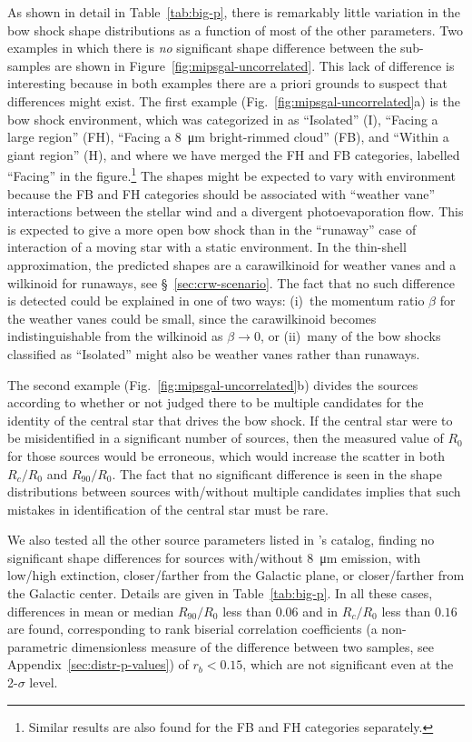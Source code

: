 As shown in detail in Table~\ref{tab:big-p}, there is remarkably
little variation in the bow shock shape distributions as a function of
most of the other parameters.  Two examples in which there is
\textit{no} significant shape difference between the sub-samples are
shown in Figure~\ref{fig:mipsgal-uncorrelated}.  This lack of
difference is interesting because in both examples there are a priori
grounds to suspect that differences might exist.  The first example (Fig.~\ref{fig:mipsgal-uncorrelated}a) is
the bow shock environment, which was categorized in
\citet{Kobulnicky:2016a} as ``Isolated'' (I), ``Facing a large \hii{}
region'' (FH), ``Facing a \SI{8}{\um} bright-rimmed cloud'' (FB), and
``Within a giant \hii{} region'' (H), and where we have merged the FH
and FB categories, labelled ``Facing'' in the figure.\footnote{Similar
  results are also found for the FB and FH categories separately.}
The shapes might be expected to vary with environment because the FB
and FH categories should be associated with ``weather vane''
interactions \citep{Povich:2008a} between the stellar wind and a
divergent photoevaporation flow.  This is expected to give a more open
bow shock than in the ``runaway'' case of interaction of a moving star
with a static environment.  In the thin-shell approximation, the
predicted shapes are a carawilkinoid for weather vanes and a wilkinoid
for runaways, see \S~\ref{sec:crw-scenario}.  The fact that no such
difference is detected could be explained in one of two ways: (i)~the
momentum ratio \(\beta\) for the weather vanes could be small, since the
carawilkinoid becomes indistinguishable from the wilkinoid as
\(\beta \to 0\), or (ii)~many of the bow shocks classified as ``Isolated''
might also be weather vanes rather than runaways.

The second example (Fig.~\ref{fig:mipsgal-uncorrelated}b) divides the
sources according to whether or not \citet{Kobulnicky:2016a} judged
there to be multiple candidates for the identity of the central star
that drives the bow shock.  If the central star were to be
misidentified in a significant number of sources, then the measured
value of \(R_0\) for those sources would be erroneous, which would
increase the scatter in both \(R_c/R_0\) and \(R_{90}/R_0\).  The
fact that no significant difference is seen in the shape distributions
between sources with/without multiple candidates implies that such
mistakes in identification of the central star must be rare.

We also tested all the other source parameters listed in
\citeauthor{Kobulnicky:2016a}'s catalog, finding no significant shape
differences for sources with/without \SI{8}{\um} emission, with
low/high extinction, closer/farther from the Galactic plane, or
closer/farther from the Galactic center. Details are given in
Table~\ref{tab:big-p}.  In all these cases, differences in mean or
median \(R_{90}/R_0\) less than \(0.06\) and in \(R_c/R_0\) less than
\(0.16\) are found, corresponding to rank biserial correlation
coefficients (a non-parametric dimensionless measure of the difference
between two samples, see Appendix~\ref{sec:distr-p-values}) of
\(r_b < 0.15\), which are not significant even at the 2-\(\sigma\) level.

